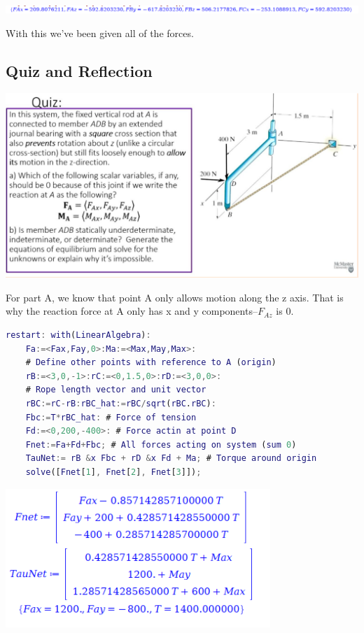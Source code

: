 \documentclass{article}[14pt, letterpaper, Times New Roman]
\begin{document}
\includegraphics[width=15cm]{l6-lq1-o.png}

With this we've been given all of the forces.

\subsection{Quiz and Reflection}

\includegraphics[width=15cm]{l6-quiz.png}

For part A, we know that point A only allows motion along the z axis.
That is why the reaction force at A only has x and y components--$F_{Az}$ is 0.

\begin{lstlisting}[language=matlab, basicstyle=\small]
	restart: with(LinearAlgebra):
	Fa:=<Fax,Fay,0>:Ma:=<Max,May,Max>:
	# Define other points with reference to A (origin)
	rB:=<3,0,-1>:rC:=<0,1.5,0>:rD:=<3,0,0>:
	# Rope length vector and unit vector
	rBC:=rC-rB:rBC_hat:=rBC/sqrt(rBC.rBC):
	Fbc:=T*rBC_hat: # Force of tension
	Fd:=<0,200,-400>: # Force actin at point D
	Fnet:=Fa+Fd+Fbc; # All forces acting on system (sum 0)
	TauNet:= rB &x Fbc + rD &x Fd + Ma; # Torque around origin
	solve([Fnet[1], Fnet[2], Fnet[3]]);
\end{lstlisting}

\includegraphics[width=10cm]{l6-quiz-o.png}
\end{document}
